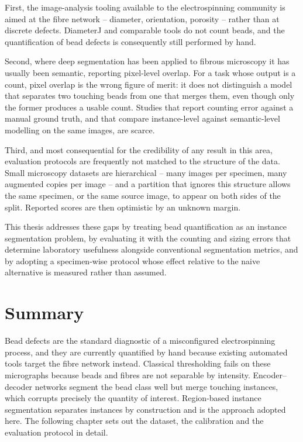 First, the image-analysis tooling available to the electrospinning community is
aimed at the fibre network -- diameter, orientation, porosity -- rather than at
discrete defects. DiameterJ and comparable tools do not count beads, and the
quantification of bead defects is consequently still performed by hand.

Second, where deep segmentation has been applied to fibrous microscopy it has
usually been semantic, reporting pixel-level overlap. For a task whose output is a
count, pixel overlap is the wrong figure of merit: it does not distinguish a model
that separates two touching beads from one that merges them, even though only the
former produces a usable count. Studies that report counting error against a manual
ground truth, and that compare instance-level against semantic-level modelling on
the same images, are scarce.

Third, and most consequential for the credibility of any result in this area,
evaluation protocols are frequently not matched to the structure of the data. Small
microscopy datasets are hierarchical -- many images per specimen, many augmented
copies per image -- and a partition that ignores this structure allows the same
specimen, or the same source image, to appear on both sides of the split. Reported
scores are then optimistic by an unknown margin.

This thesis addresses these gaps by treating bead quantification as an instance
segmentation problem, by evaluating it with the counting and sizing errors that
determine laboratory usefulness alongside conventional segmentation metrics, and by
adopting a specimen-wise protocol whose effect relative to the naive alternative is
measured rather than assumed.


\section{Summary}

Bead defects are the standard diagnostic of a misconfigured electrospinning process,
and they are currently quantified by hand because existing automated tools target
the fibre network instead. Classical thresholding fails on these micrographs because
beads and fibres are not separable by intensity. Encoder--decoder networks segment
the bead class well but merge touching instances, which corrupts precisely the
quantity of interest. Region-based instance segmentation separates instances by
construction and is the approach adopted here. The following chapter sets out the
dataset, the calibration and the evaluation protocol in detail.
